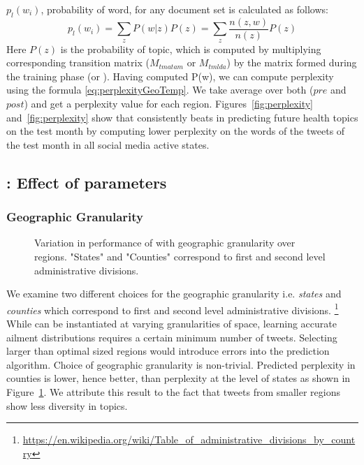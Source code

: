 $p_l(w_i)$, probability of word, for any document set is calculated as follows:
\begin{equation}
\label{eq:probabilityword}
p_l(w_i)=\sum_{z}P(w|z)P(z) = \sum_{z}\frac{n(z,w)}{n(z)}P(z)
\end{equation}
Here $P(z)$ is the probability of topic, which is computed by  multiplying corresponding transition matrix ($M_{tmatam}$ or $M_{tmlda}$) by the matrix formed during the training phase (\tmatam or \tmlda). Having computed P(w), we can compute perplexity using the formula \ref{eq:perplexityGeoTemp}. We take average over both \changes ($pre$ and $post$) and get a perplexity value for each region. 
Figures~\ref{fig:perplexity} and~\ref{fig:perplexity} show that \tmatam
consistently beats \tmlda in predicting
future health topics on the test month by computing lower perplexity on the words of the tweets of the test month in all social media active states.
\subsection{\tmatam: Effect of parameters}
\label{subsec:perf2}
\subsubsection{Geographic Granularity}
\begin{figure}[b!]
\centering
{}
\caption{Variation in performance of \tmatam with geographic granularity over regions. "States" and "Counties" correspond to first and second level administrative divisions.}
\label{fig:perplexitySpatial}
\end{figure}
We examine two different choices for the geographic 
granularity i.e. \emph{states} and \emph{counties} which correspond to
first and second level administrative divisions. \footnote{\url{https://en.wikipedia.org/wiki/Table_of_administrative_divisions_by_country}}
While \tmatam can be instantiated at varying granularities of space, 
learning accurate ailment distributions requires a certain minimum number 
of tweets.  Selecting larger 
than optimal sized regions would introduce errors 
into the prediction algorithm. Choice of geographic granularity is non-trivial.
Predicted perplexity in counties is lower, hence better, than perplexity at the level of states as shown in Figure~\ref{fig:perplexitySpatial}.
We attribute this result to the fact that tweets from smaller regions show less diversity in topics.
